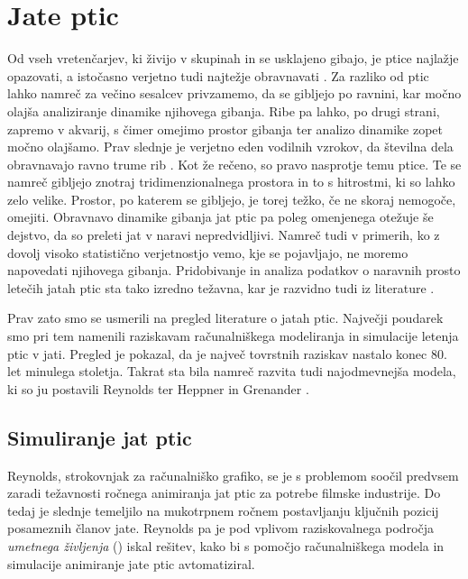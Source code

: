 \section{Jate ptic}
Od vseh vretenčarjev, ki živijo v skupinah in se usklajeno gibajo, je ptice najlažje opazovati, a istočasno verjetno tudi najtežje obravnavati \cite{heppner:1997}. Za razliko od ptic lahko namreč za večino sesalcev privzamemo, da se gibljejo po ravnini, kar močno olajša analiziranje dinamike njihovega gibanja. Ribe pa lahko, po drugi strani, zapremo v akvarij, s čimer omejimo prostor gibanja ter analizo dinamike zopet močno olajšamo. Prav slednje je verjetno eden vodilnih vzrokov, da številna dela obravnavajo ravno trume rib \cite{aoki:1982,dill:1997,mcfarland:1997,partridge:1982,shaw:1962,terzopoulos:1994,tu:1994,tu:1999,ward:2001,zaera:1996}. Kot že rečeno, so pravo nasprotje temu ptice. Te se namreč gibljejo znotraj tridimenzionalnega prostora in to s hitrostmi, ki so lahko zelo velike. Prostor, po katerem se gibljejo, je torej težko, če ne skoraj nemogoče, omejiti. Obravnavo dinamike gibanja jat ptic pa poleg omenjenega otežuje še dejstvo, da so preleti jat v naravi nepredvidljivi. Namreč tudi v primerih, ko z dovolj visoko statistično verjetnostjo vemo, kje se pojavljajo, ne moremo napovedati njihovega gibanja. Pridobivanje in analiza podatkov o naravnih prosto letečih jatah ptic sta tako izredno težavna, kar je razvidno tudi iz literature \cite{gould:1974,heppner:1997,jaffe:1997,moyle:1998}.

Prav zato smo se usmerili na pregled literature o jatah ptic. Največji poudarek smo pri tem namenili raziskavam računalniškega modeliranja in simulacije letenja ptic v jati. Pregled je pokazal, da je največ tovrstnih raziskav nastalo konec 80. let minulega stoletja. Takrat sta bila namreč razvita tudi najodmevnejša modela, ki so ju postavili Reynolds \cite{reynolds:1987} ter Heppner in Grenander \cite{heppner:1990}. 

\subsection{Simuliranje jat ptic}
Reynolds, strokovnjak za računalniško grafiko, se je s problemom soočil predvsem zaradi težavnosti ročnega animiranja jat ptic za potrebe filmske industrije. Do tedaj je slednje temeljilo na mukotrpnem ročnem postavljanju ključnih pozicij posameznih članov jate. Reynolds pa je pod vplivom raziskovalnega področja \emph{umetnega življenja} () iskal rešitev, kako bi s pomočjo računalniškega modela in simulacije animiranje jate ptic avtomatiziral. 

